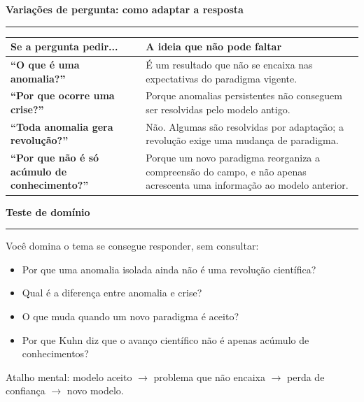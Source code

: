 \documentclass[11pt,a4paper]{article}
\newcommand{\secao}[1]{\vspace{0.8em}\noindent\textcolor{azul}{\Large\textbf{#1}}\par\vspace{0.2em}\hrule\vspace{0.35em}}
\begin{document}
\secao{Variações de pergunta: como adaptar a resposta}

\begin{tabularx}{\linewidth}{>{\bfseries}p{4.6cm}X}
\hline
\rowcolor{azulclaro}Se a pergunta pedir... & A ideia que não pode faltar \\
\hline
``O que é uma anomalia?'' & É um resultado que não se encaixa nas expectativas do paradigma vigente. \\
``Por que ocorre uma crise?'' & Porque anomalias persistentes não conseguem ser resolvidas pelo modelo antigo. \\
``Toda anomalia gera revolução?'' & Não. Algumas são resolvidas por adaptação; a revolução exige uma mudança de paradigma. \\
``Por que não é só acúmulo de conhecimento?'' & Porque um novo paradigma reorganiza a compreensão do campo, e não apenas acrescenta uma informação ao modelo anterior. \\
\hline
\end{tabularx}

\secao{Teste de domínio}

Você domina o tema se consegue responder, sem consultar:

\begin{itemize}[leftmargin=0.7cm,itemsep=0.25em]
\item Por que uma anomalia isolada ainda não é uma revolução científica?
\item Qual é a diferença entre anomalia e crise?
\item O que muda quando um novo paradigma é aceito?
\item Por que Kuhn diz que o avanço científico não é apenas acúmulo de conhecimentos?
\end{itemize}

\vfill
\small\textcolor{azul}{Atalho mental: modelo aceito $\rightarrow$ problema que não encaixa $\rightarrow$ perda de confiança $\rightarrow$ novo modelo.}
\end{document}
